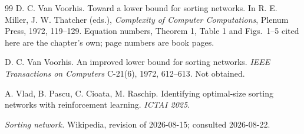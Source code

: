 \documentclass[11pt,a4paper]{article}
\begin{document}
\begin{thebibliography}{99}
 D. C. Van Voorhis. Toward a lower bound for sorting networks. In
R. E. Miller, J. W. Thatcher (eds.), \emph{Complexity of Computer Computations},
Plenum Press, 1972, 119--129. Equation numbers, Theorem 1, Table 1 and
Figs.~1--5 cited here are the chapter's own; page numbers are book pages.

 D. C. Van Voorhis. An improved lower bound for sorting networks.
\emph{IEEE Transactions on Computers} C-21(6), 1972, 612--613. Not obtained.

 A. Vlad, B. Pascu, C. Cioata, M. Raschip. Identifying
optimal-size sorting networks with reinforcement learning. \emph{ICTAI 2025}.

 \emph{Sorting network.} Wikipedia, revision of 2026-08-15;
consulted 2026-08-22.

\end{thebibliography}
\end{document}
